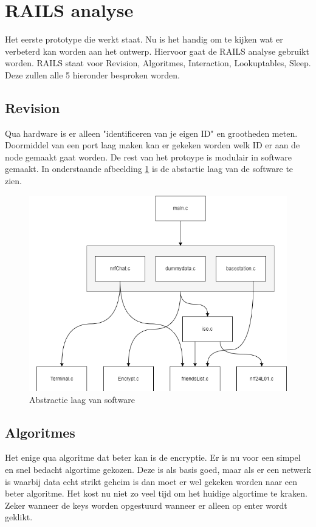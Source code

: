 \section{RAILS analyse} \label{app:railsAnalysis}
Het eerste prototype die werkt staat. Nu is het handig om te kijken wat er verbeterd kan worden aan het ontwerp.
Hiervoor gaat de RAILS analyse gebruikt worden. RAILS staat voor Revision, Algoritmes, Interaction, Lookuptables, Sleep. Deze zullen 
alle 5 hieronder besproken worden. 

\subsection{Revision}
Qua hardware is er alleen "identificeren van je eigen ID" en grootheden meten. Doormiddel van een port laag maken kan er gekeken worden welk ID er aan de node 
gemaakt gaat worden. De rest van het protoype is modulair in software gemaakt. In onderstaande afbeelding \ref{fig:AbstractionLayer} is de abstartie laag van de 
software te zien. 

\begin{figure}[h]
    \includegraphics[scale=0.5]{appendices/foto's/AbstractionLayer.drawio.png}
    \caption{Abstractie laag van software}
    \label{fig:AbstractionLayer}
    \end{figure}

\subsection{Algoritmes}
Het enige qua algoritme dat beter kan is de encryptie. Er is nu voor een simpel en snel bedacht algortime gekozen. Deze is als basis goed,
maar als er een netwerk is waarbij data echt strikt geheim is dan moet er wel gekeken worden naar een beter algoritme. Het kost nu niet 
zo veel tijd om het huidige algortime te kraken. Zeker wanneer de keys worden opgestuurd wanneer er alleen op enter wordt geklikt.

